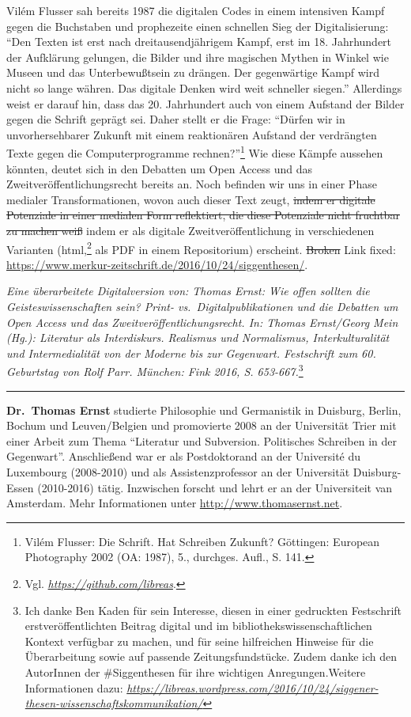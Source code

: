 \documentclass[a4paper,
fontsize=11pt,
oneside,
numbers=noperiodatend,
parskip=half-,
bibliography=totoc,
final
]{scrartcl}
\begin{document}
Vilém Flusser sah bereits 1987 die digitalen Codes in einem intensiven
Kampf gegen die Buchstaben und prophezeite einen schnellen Sieg der
Digitalisierung: \enquote{Den Texten ist erst nach dreitausendjährigem
Kampf, erst im 18. Jahrhundert der Aufklärung gelungen, die Bilder und
ihre magischen Mythen in Winkel wie Museen und das Unterbewußtsein zu
drängen. Der gegenwärtige Kampf wird nicht so lange währen. Das digitale
Denken wird weit schneller siegen.} Allerdings weist er darauf hin, dass
das 20. Jahrhundert auch von einem Aufstand der Bilder gegen die Schrift
geprägt sei. Daher stellt er die Frage: \enquote{Dürfen wir in
unvorhersehbarer Zukunft mit einem reaktionären Aufstand der verdrängten
Texte gegen die Computerprogramme rechnen?}\footnote{Vilém Flusser: Die
  Schrift. Hat Schreiben Zukunft? Göttingen: European Photography 2002
  (OA: 1987), 5., durchges. Aufl., S. 141.} Wie diese Kämpfe aussehen
könnten, deutet sich in den Debatten um Open Access und das
Zweitveröffentlichungsrecht bereits an. Noch befinden wir uns in einer
Phase medialer Transformationen, wovon auch dieser Text zeugt,
\sout{indem
er digitale Potenziale in einer medialen Form reflektiert, die diese
Potenziale nicht fruchtbar zu machen weiß} indem er als digitale
Zweitveröffentlichung in verschiedenen Varianten (html,\footnote{Vgl.
  \href{https://github.com/libreas}{\emph{https://github.com/libreas}}.}
als PDF in einem Repositorium) erscheint. \sout{Broken} Link fixed:
\url{https://www.merkur-zeitschrift.de/2016/10/24/siggenthesen/}.

\emph{Eine überarbeitete Digitalversion von: Thomas Ernst: Wie offen
sollten die Geisteswissenschaften sein? Print- vs.~Digitalpublikationen
und die Debatten um Open Access und das Zweitveröffentlichungsrecht. In:
Thomas Ernst/Georg Mein (Hg.): Literatur als Interdiskurs. Realismus und
Normalismus, Interkulturalität und Intermedialität von der Moderne bis
zur Gegenwart. Festschrift zum 60. Geburtstag von Rolf Parr. München:
Fink 2016, S. 653-667.}\footnote{Ich danke Ben Kaden für sein Interesse,
  diesen in einer gedruckten Festschrift erstveröffentlichten Beitrag
  digital und im bibliothekswissenschaftlichen Kontext verfügbar zu
  machen, und für seine hilfreichen Hinweise für die Überarbeitung sowie
  auf passende Zeitungsfundstücke. Zudem danke ich den AutorInnen der
  \#Siggenthesen für ihre wichtigen Anregungen.Weitere Informationen
  dazu:
  \href{https://libreas.wordpress.com/2016/10/24/siggener-thesen-wissenschaftskommunikation/}{\emph{https://libreas.wordpress.com/2016/10/24/siggener-thesen-wissenschaftskommunikation/}}}

\begin{center}\rule{0.5\linewidth}{\linethickness}\end{center}

\textbf{Dr.~Thomas Ernst} studierte Philosophie und Germanistik in
Duisburg, Berlin, Bochum und Leuven/Belgien und promovierte 2008 an der
Universität Trier mit einer Arbeit zum Thema ``Literatur und Subversion.
Politisches Schreiben in der Gegenwart''. Anschließend war er als
Postdoktorand an der Université du Luxembourg (2008-2010) und als
Assistenzprofessor an der Universität Duisburg-Essen (2010-2016) tätig.
Inzwischen forscht und lehrt er an der Universiteit van Amsterdam. Mehr
Informationen unter \url{http://www.thomasernst.net}.
\end{document}
